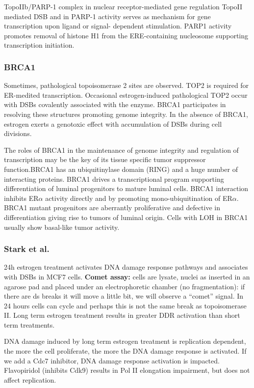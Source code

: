 TopoIIb/PARP-1 complex in nuclear receptor-mediated gene regulation TopoII mediated DSB and in PARP-1 activity serves as mechanism for gene transcription upon ligand or signal- dependent stimulation. PARP1 activity promotes removal of histone H1 from the ERE-containing nucleosome supporting transcription initiation.

\hypertarget{brca1}{%
\subsubsection{BRCA1}\label{brca1}}

Sometimes, pathological topoisomerase 2 sites are observed. TOP2 is required for ER-medited transcription. Occasional estrogen-induced pathological TOP2 occur with DSBs covalently associated with the enzyme. BRCA1 participates in resolving these structures promoting genome integrity. In the absence of BRCA1, estrogen exerts a genotoxic effect with accumulation of DSBs during cell divisions.

The roles of BRCA1 in the maintenance of genome integrity and regulation of transcription may be the key of its tissue specific tumor suppressor function.BRCA1 has an ubiquitinylase domain (RING) and a huge number of interacting proteins. BRCA1 drives a transcriptional program supporting differentiation of luminal progenitors to mature luminal cells. BRCA1 interaction inhibits ER$\alpha$ activity directly and by promoting mono-ubiquitination of ER$\alpha$. BRCA1 mutant progenitors are aberrantly proliferative and defective in differentiation giving rise to tumors of luminal origin. Cells with LOH in BRCA1 usually show basal-like tumor activity.

\hypertarget{stark-et-al.}{%
\subsubsection{Stark et al.}\label{stark-et-al.}}

24h estrogen treatment activates DNA damage response pathways and associates with DSBs in MCF7 cells. \textbf{Comet assay:} cells are lysate, nuclei as inserted in an agarose pad and placed under an electrophoretic chamber (no fragmentation): if there are ds breaks it will move a little bit, we will observe a ``comet'' signal. In 24 hours cells can cycle and perhaps this is not the same break as topoisomerase II. Long term estrogen treatment results in greater DDR activation than short term treatments.

DNA damage induced by long term estrogen treatment is replication dependent, the more the cell proliferate, the more the DNA damage response is activated. If we add a Cdc7 inhibitor, DNA damage response activation is impacted. Flavopiridol (inhibits Cdk9) results in Pol II elongation impairment, but does not affect replication.

